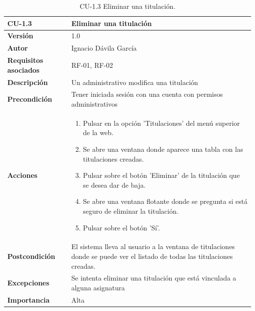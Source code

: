 \begin{table}[p]
	\centering
	\begin{tabularx}{\linewidth}{ p{} p{} }
		\toprule
		\textbf{CU-1.3}    & \textbf{Eliminar una titulación}\\
		\toprule
		\textbf{Versión}              & 1.0    \\
		\textbf{Autor}                & Ignacio Dávila García \\
		\textbf{Requisitos asociados} & RF-01, RF-02 \\
		\textbf{Descripción}          & Un administrativo modifica una titulación \\
		\textbf{Precondición}         & Tener iniciada sesión con una cuenta con permisos administrativos \\
		\textbf{Acciones}             &
		\begin{enumerate}
			\def\labelenumi{\arabic{enumi}.}
			\tightlist
			\item Pulsar en la opción 'Titulaciones' del menú superior de la web.
			\item Se abre una ventana donde aparece una tabla con las titulaciones creadas.
			\item Pulsar sobre el botón 'Eliminar' de la titulación que se desea dar de baja.
			\item Se abre una ventana flotante donde se pregunta si está seguro de eliminar la titulación.
			\item Pulsar sobre el botón 'Sí'.
		\end{enumerate}\\
		\textbf{Postcondición}        & El sistema lleva al usuario a la ventana de titulaciones donde se puede ver el listado de todas las titulaciones creadas. \\
		\textbf{Excepciones}          & Se intenta eliminar una titulación que está vinculada a alguna asignatura \\
		\textbf{Importancia}          & Alta \\
		\bottomrule
	\end{tabularx}
	\caption{CU-1.3 Eliminar una titulación.}
\end{table}

